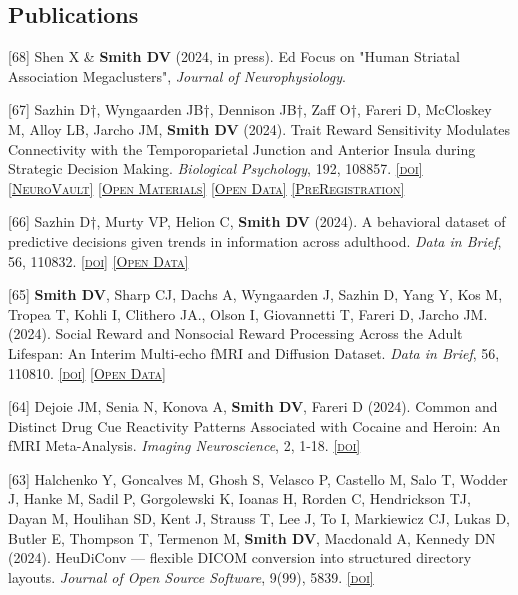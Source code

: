 \documentclass[11pt, letterpaper]{article}
\newcommand{\doi}[1]{\href{#1}{\scriptsize\textsc{[doi]}}} %
\newcommand{\neurovault}[1]{\href{#1}{\scriptsize\textsc{[NeuroVault]}}}
\newcommand{\materials}[1]{\href{#1}{\scriptsize\textsc{[Open Materials]}}}
\newcommand{\data}[1]{\href{#1}{\scriptsize\textsc{[Open Data]}}}
\newcommand{\preregistration}[1]{\href{#1}{\scriptsize\textsc{[PreRegistration]}}}
\begin{document}
\subsection*{Publications}

\begin{hangparas}{.5in}{1}

[68] Shen X \& \textbf{Smith DV} (2024, in press). Ed Focus on "Human Striatal Association Megaclusters", \textit{Journal of Neurophysiology}. 

[67] Sazhin D†, Wyngaarden JB†, Dennison JB†, Zaff O†, Fareri D, McCloskey M, Alloy LB, Jarcho JM, \textbf{Smith DV} (2024). Trait Reward Sensitivity Modulates Connectivity with the Temporoparietal Junction and Anterior Insula during Strategic Decision Making. \textit{Biological Psychology}, 192, 108857. \doi{https://doi.org/10.1016/j.biopsycho.2024.108857} \neurovault{https://identifiers.org/neurovault.collection:15045} \materials{https://github.com/DVS-Lab/istart-ugdg} \data{https://openneuro.org/datasets/ds004920} \preregistration{https://aspredicted.org/55gd8.pdf} 

[66] Sazhin D†, Murty VP, Helion C, \textbf{Smith DV} (2024). A behavioral dataset of predictive decisions given trends in information across adulthood. \textit{Data in Brief}, 56, 110832. \doi{https://doi.org/10.1016/j.dib.2024.110832} \data{https://zenodo.org/doi/10.5281/zenodo.11513694}

[65] \textbf{Smith DV}, Sharp CJ, Dachs A, Wyngaarden J, Sazhin D, Yang Y, Kos M, Tropea T, Kohli I, Clithero JA., Olson I, Giovannetti T, Fareri D, Jarcho JM. (2024). Social Reward and Nonsocial Reward Processing Across the Adult Lifespan: An Interim Multi-echo fMRI and Diffusion Dataset. \textit{Data in Brief}, 56, 110810. \doi{https://doi.org/10.1016/j.dib.2024.110810} \data{https://doi.org/10.18112/openneuro.ds005123.v1.1.3}

[64] Dejoie JM, Senia N, Konova A, \textbf{Smith DV}, Fareri D (2024). Common and Distinct Drug Cue Reactivity Patterns Associated with Cocaine and Heroin: An fMRI Meta-Analysis. \textit{Imaging Neuroscience}, 2, 1-18. \doi{https://doi.org/10.1162/imag_a_00211}

[63] Halchenko Y, Goncalves M, Ghosh S, Velasco P, Castello M, Salo T, Wodder J, Hanke M, Sadil P, Gorgolewski K, Ioanas H, Rorden C, Hendrickson TJ, Dayan M, Houlihan SD, Kent J, Strauss T, Lee J, To I, Markiewicz CJ, Lukas D, Butler E, Thompson T, Termenon M, \textbf{Smith DV}, Macdonald A, Kennedy DN (2024). HeuDiConv — flexible DICOM conversion into structured directory layouts. \textit{Journal of Open Source Software}, 9(99), 5839. \doi{https://doi.org/10.21105/joss.05839}


\end{hangparas}
\end{document}
